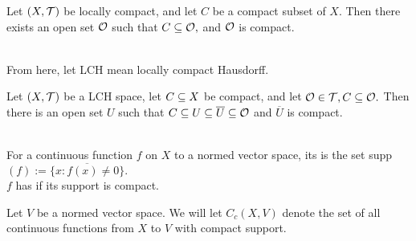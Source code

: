 \begin{prop}
Let $(X,\mathcal{T})$ be locally compact, and let $C$ be a compact subset of $X.$ Then there exists an open set $\mathcal{O}$ such that $C\subseteq\mathcal{O},$ and $\mathcal{O}$ is compact.\\ \\
\end{prop}

\noindent From here, let LCH mean locally compact Hausdorff.

\begin{prop}
Let $(X,\mathcal{T})$ be a LCH space, let $C\subseteq X$ be compact, and let $\mathcal{O}\in\mathcal{T}, C\subseteq\mathcal{O}.$ Then there is an open set $U$ such that $C\subseteq U\subseteq\overline{U}\subseteq\mathcal{O}$ and $\overline{U}$ is compact. \\ \\
\end{prop}

\begin{defn}
For a continuous function $f$ on $X$ to a normed vector space, its  is the set supp$(f):=\overline{\{x:f(x)\neq 0\}}.$ \\
$f$ has  if its support is compact. \\
\end{defn}

\noindent Let $V$ be a normed vector space. We will let $C_c(X,V)$ denote the set of all continuous functions from $X$ to $V$ with compact support.

